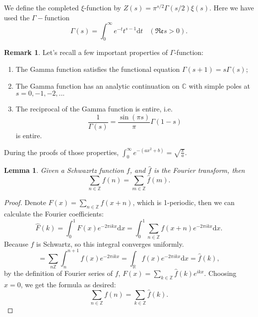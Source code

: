 \documentclass[12pt,a4paper,english]{article}
\theoremstyle{plain}
\newtheorem{lem}[thm]{Lemma}
\theoremstyle{definition}
\newtheorem*{rem}{Remark}
\begin{document}
We define the completed $\xi$-function by $Z(s)=\pi^{s/2}\Gamma(s/2)\xi(s)$. Here we have used the $\Gamma-$function
\begin{equation*}
    \Gamma(s)=\int^{\infty}_{0}e^{-t}t^{s-1}\text{d}t\ \ \ \ (\mathfrak{Re}s>0). 
\end{equation*}
\begin{rem}
Let's recall a few important properties of $\Gamma$-function:
\begin{enumerate}
    \item The Gamma function satisfies the functional equation $\Gamma(s+1)=s\Gamma(s)$;
    \item The Gamma function has an analytic continuation on $\mathbb{C}$ with simple poles at $s=0,-1,-2,...$
    \item The reciprocal of the Gamma function is entire, i.e. 
    \begin{equation*}
        \frac{1}{\Gamma(s)}=\frac{\sin(\pi s)}{\pi}\Gamma(1-s)
    \end{equation*}
    is entire.
\end{enumerate}
During the proofs of those properties, $\int^{\infty}_{0}e^{-(ax^{2}+b)}=\sqrt{\frac{\pi}{a}}$.
\end{rem}
\begin{lem}\label{PoiR}
Given a Schwazrtz function $f$, and $\hat{f}$ is the Fourier transform, then
\begin{equation*}
    \sum_{n\in\mathbb{Z}}f(n)=\sum_{m\in\mathbb{Z}}\hat{f}(m).
\end{equation*}
\end{lem}
\begin{proof}
Denote $F(x)=\sum_{n\in\mathbb{Z}}f(x+n)$, which is 1-periodic, then we can calculate the Fourier coefficients: 
\begin{equation*}
    \hat{F}(k)=\int^{1}_{0}F(x)e^{-2\pi ikx}\text{d}x=\int^{1}_{0}\sum_{n\in\mathbb{Z}}f(x+n)e^{-2\pi ikx}\text{d}x.
\end{equation*}
Because $f$ is Schwartz, so this integral converges uniformly.
\begin{equation*}
    =\sum_{n\mathbb{Z}}\int^{n+1}_{n}f(x)e^{-2\pi ikx}=\int_{\mathbb{R}}f(x)e^{-2\pi ikx}\text{d}x=\hat{f}(k),
\end{equation*}
by the definition of Fourier series of $f$, $F(x)=\sum\limits_{k\in\mathbb{Z}}\hat{f}(k)e^{ikx}$. Choosing $x=0$, we get the formula as desired:
\begin{equation*}
    \sum_{n\in\mathbb{Z}}f(n)=\sum_{k\in\mathbb{Z}}\hat{f}(k).
\end{equation*}
\end{proof}
\end{document}
